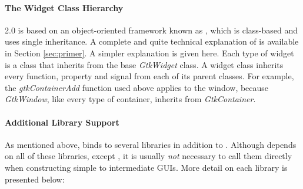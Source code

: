 \documentclass[article]{jss}
\begin{document}
\paragraph{The Widget Class Hierarchy}

 2.0 is based on an object-oriented framework known as ,
which is class-based and uses single inheritance. A complete and quite technical
explanation of  is available in Section \ref{sec:primer}. 
A simpler explanation is given here. Each type of widget is a class that 
inherits from the base \emph{GtkWidget}
class. A widget class inherits every function, property and signal from each of
its parent classes. For example, the \emph{gtkContainerAdd} function used above
applies to the window, because \emph{GtkWindow}, like every type of container,
inherits from \emph{GtkContainer}.

\paragraph{Additional Library Support}

As mentioned above,  binds to several libraries in addition to 
. Although  depends on all of these libraries, except , 
it is usually \emph{not} necessary to call them directly when constructing simple to 
intermediate GUIs. More detail on each library is presented below:
\end{document}

